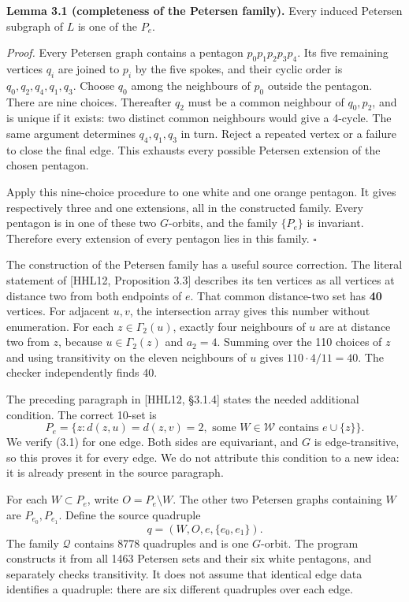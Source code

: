 \documentclass[
  11pt,
  a4paper,
]{article}
\begin{document}
\textbf{Lemma 3.1 (completeness of the Petersen family).} Every induced
Petersen subgraph of \(L\) is one of the \(P_e\).

\emph{Proof.} Every Petersen graph contains a pentagon
\(p_0p_1p_2p_3p_4\). Its five remaining vertices \(q_i\) are joined to
\(p_i\) by the five spokes, and their cyclic order is
\(q_0,q_2,q_4,q_1,q_3\). Choose \(q_0\) among the neighbours of \(p_0\)
outside the pentagon. There are nine choices. Thereafter \(q_2\) must be
a common neighbour of \(q_0,p_2\), and is unique if it exists: two
distinct common neighbours would give a 4-cycle. The same argument
determines \(q_4,q_1,q_3\) in turn. Reject a repeated vertex or a
failure to close the final edge. This exhausts every possible Petersen
extension of the chosen pentagon.

Apply this nine-choice procedure to one white and one orange pentagon.
It gives respectively three and one extensions, all in the constructed
family. Every pentagon is in one of these two \(G\)-orbits, and the
family \(\{P_e\}\) is invariant. Therefore every extension of every
pentagon lies in this family. \(\square\)

The construction of the Petersen family has a useful source correction.
The literal statement of {[}HHL12, Proposition 3.3{]} describes its ten
vertices as all vertices at distance two from both endpoints of \(e\).
That common distance-two set has \textbf{40} vertices. For adjacent
\(u,v\), the intersection array gives this number without enumeration.
For each \(z\in\Gamma_2(u)\), exactly four neighbours of \(u\) are at
distance two from \(z\), because \(u\in\Gamma_2(z)\) and \(a_2=4\).
Summing over the 110 choices of \(z\) and using transitivity on the
eleven neighbours of \(u\) gives \(110\cdot4/11=40\). The checker
independently finds 40.

The preceding paragraph in {[}HHL12, §3.1.4{]} states the needed
additional condition. The correct 10-set is \[
 P_e=\{z:d(z,u)=d(z,v)=2,
       \text{ some }W\in\mathcal W\text{ contains }e\cup\{z\}\}.
 \tag{3.1}
\] We verify (3.1) for one edge. Both sides are equivariant, and \(G\)
is edge-transitive, so this proves it for every edge. We do not
attribute this condition to a new idea: it is already present in the
source paragraph.

For each \(W\subset P_e\), write \(O=P_e\setminus W\). The other two
Petersen graphs containing \(W\) are \(P_{e_0},P_{e_1}\). Define the
source quadruple \[
 q=(W,O,e,\{e_0,e_1\}).
\] The family \(\mathcal Q\) contains 8778 quadruples and is one
\(G\)-orbit. The program constructs it from all 1463 Petersen sets and
their six white pentagons, and separately checks transitivity. It does
not assume that identical edge data identifies a quadruple: there are
six different quadruples over each edge.
\end{document}
